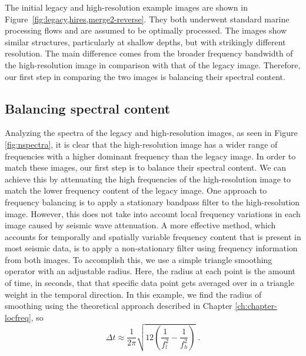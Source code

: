     The initial legacy and high-resolution example images are shown in Figure~\ref{fig:legacy,hires,merge2-reverse}. 
    They both underwent standard marine processing flows and are assumed to be optimally processed.
    The images show similar structures, particularly at shallow depths, but with strikingly different resolution. 
    The main difference comes from the broader frequency bandwidth of the high-resolution image in comparison with that of the legacy image. 
    Therefore, our first step in comparing the two images is balancing their spectral content.

\subsection{Balancing spectral content}

    Analyzing the spectra of the legacy and high-resolution images, as seen in Figure \ref{fig:nspectra}, it is clear that the high-resolution image has a wider range of frequencies with a higher dominant frequency than the legacy image. 
    In order to match these images, our first step is to balance their spectral content. 
    We can achieve this by attenuating the high frequencies of the high-resolution image to match the lower frequency content of the legacy image. 
    One approach to frequency balancing is to apply a stationary bandpass filter to the high-resolution image. 
    However, this does not take into account local frequency variations in each image caused by seismic wave attenuation.
    A more effective method, which accounts for temporally and spatially variable frequency content that is present in most seismic data, is to apply a non-stationary filter using frequency information from both images. 
    To accomplish this, we use a simple triangle smoothing operator with an adjustable radius. 
    Here, the radius at each point is the amount of time, in seconds, that that specific data point gets averaged over in a triangle weight in the temporal direction.
    In this example, we find the radius of smoothing using the theoretical approach described in Chapter \ref{ch:chapter-locfreq}, so 
    \begin{equation}
        \label{eq:rad}
        \Delta t \approx \frac{1}{2\pi}\sqrt{12\left(\frac{1}{f_{l}^{2}}-\frac{1}{f_{h}^{2}}\right)}\;.
    \end{equation}
